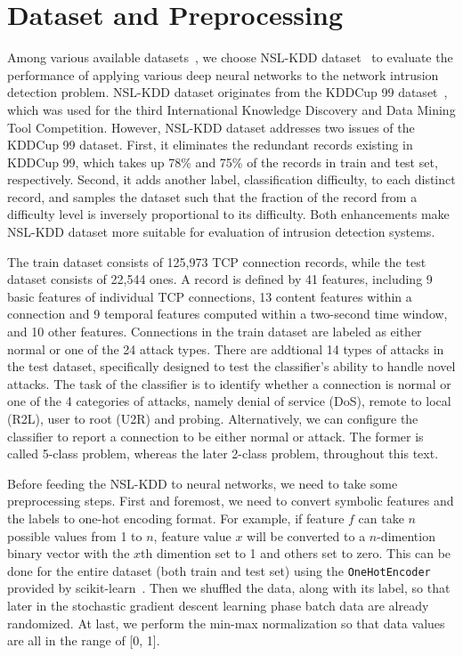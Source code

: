 \section{Dataset and Preprocessing}
Among various available datasets~\cite{NSL-KDD, KDDCup, DARPA},
we choose NSL-KDD dataset~\cite{NSL-KDD} to evaluate the performance of applying
various deep neural networks to the network intrusion detection problem.
NSL-KDD dataset originates from the KDDCup 99 dataset~\cite{KDDCup},
which was used for the third International Knowledge Discovery and Data Mining Tool Competition.
However, NSL-KDD dataset addresses two issues of the KDDCup 99 dataset.
First, it eliminates the redundant records existing in KDDCup 99, which takes up
78\% and 75\% of the records in train and test set, respectively.
Second, it adds another label, classification difficulty, to each distinct record,
and samples the dataset such that the fraction of the record
from a difficulty level is inversely proportional to its difficulty.
Both enhancements make NSL-KDD dataset more suitable for
evaluation of intrusion detection systems.

The train dataset consists of 125,973 TCP connection records, while the test dataset
consists of 22,544 ones.
A record is defined by 41 features, including 9 basic features of individual
TCP connections, 13 content features within a connection and 9 temporal features computed
within a two-second time window, and 10 other features.
Connections in the train dataset are labeled as either normal or one of the 24 attack
types.
There are addtional 14 types of attacks in the test dataset, specifically designed to
test the classifier's ability to handle novel attacks.
The task of the classifier is to identify whether a connection is normal or one of the
4 categories of attacks, namely denial of service (DoS), remote to local (R2L), user to
root (U2R) and probing.
Alternatively, we can configure the classifier to report a connection to be either
normal or attack.
The former is called 5-class problem, whereas the later 2-class problem,
throughout this text.

Before feeding the NSL-KDD to neural networks, we need to take some preprocessing steps.
First and foremost, we need to convert symbolic features and the labels to one-hot encoding
format.
For example, if feature $f$ can take $n$ possible values from 1 to $n$,
feature value $x$ will be converted to a $n$-dimention binary vector with the $x$th
dimention set to 1 and others set to zero.
This can be done for the entire dataset (both train and test set)
using the \texttt{OneHotEncoder} provided by scikit-learn~\cite{OneHotEncoder}.
Then we shuffled the data, along with its label, so that later in the stochastic
gradient descent learning phase batch data are already randomized.
At last, we perform the min-max normalization so that data values are all in the range
of [0, 1].
